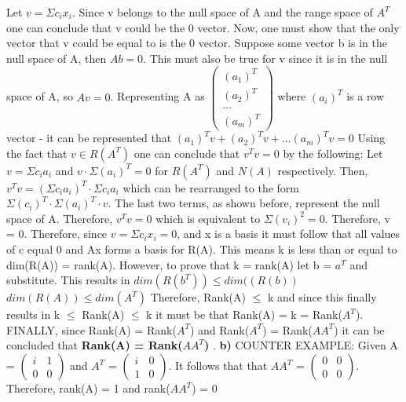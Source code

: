 \documentclass[12pt]{article}
\begin{document}
\newline
Let $v = \Sigma c_{i}x_{i}$. Since v belongs to the null space of A and the range space of $A^{T}$ one can conclude that v could be the 0 vector. Now, one must show that the only vector that v could be equal to is the 0 vector.
\newline
Suppose some vector b is in the null space of A, then $Ab=0$. This must also be true for v since it is in the null space of A, so $Av=0$. Representing A as $\left(\begin{array}{c} (a_{1})^{T}  \\ (a_{2})^{T}  \\ ... \\ (a_{m})^{T} \end{array}\right)$ where $(a_{i})^{T}$ is a row vector - it can be represented that $(a_{1})^{T}v + (a_{2})^{T}v + ... (a_{m})^{T}v=0$
\newline
Using the fact that $v \in R(A^{T})$ one can conclude that $v^{T}v = 0$ by the following:
\newline
Let $v = \Sigma c_{i}a_{i}$  and $v \cdot \Sigma (a_{i})^{T} = 0$ for $R(A^{T})$ and $N(A)$ respectively. Then, $v^{T}v = (\Sigma c_{i}a_{i})^{T} \cdot \Sigma c_{i}a_{i}$ which can be rearranged to the form $\Sigma (c_{i})^{T} \cdot \Sigma (a_{i})^{T} \cdot v$. The last two terms, as shown before, represent the null space of A. Therefore, $v^{T}v = 0$ which is equivalent to $\Sigma (v_{i})^{2} = 0$. Therefore, v = 0.
\newline
Therefore, since $v = \Sigma c_{i}x_{i} = 0$, and x is a basis it must follow that all values of c equal 0 and Ax forms a basis for R(A). This means k is less than or equal to dim(R(A)) = rank(A). However, to prove that k = rank(A) let b = $a^{T}$ and substitute. 
\newline
This results in $dim(R(b^{T})) \leq dim((R(b))$ 
\newline
$dim(R(A)) \leq dim(A^{T})$
Therefore, Rank(A) $\leq$ k and since this finally results in k $\leq$ Rank(A) $\leq$ k it must be that Rank(A) = k = Rank($A^{T}$).
\newline
FINALLY, since Rank(A) = Rank($A^{T}$) and Rank($A^{T}$) = Rank($AA^{T}$) it can be concluded that \textbf{Rank(A) = Rank($AA^{T}$)} .
\newline
\textbf{b)}
\newline
COUNTER EXAMPLE:
\newline
Given A = $\left(\begin{array}{cc} i&1  \\ 0&0 \end{array}\right)$ and $A^{T}$ = $\left(\begin{array}{cc} i&0  \\ 1&0 \end{array}\right)$. It follows that that $AA^{T}$ = $\left(\begin{array}{cc} 0&0  \\ 0&0 \end{array}\right)$. Therefore, rank(A) = 1 and rank($AA^{T}$) = 0
\end{document}
